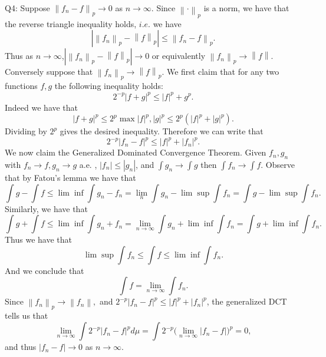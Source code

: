 \documentclass[letterpaper]{article}
\newcommand{\norm}[1]{\left\lVert#1\right\rVert}
\begin{document}
Q4: Suppose $\norm{f_n-f}_p \to 0$ as $n\to \infty$. Since $\norm{\cdot}_p$ is a norm, we have that the reverse triangle inequality holds, $i.e.$ we have $$|\norm{f_n}_p - \norm{f}_p|\leq \norm{f_n-f}_p.$$ Thus as $n\to \infty$,$|\norm{f_n}_p - \norm{f}_p|\to 0$ or equivalently $\norm{f_n}_p \to \norm{f}$. Conversely suppose that $\norm{f_n}_p \to \norm{f}_p $. We first claim that for any two functions $f,g$ the following inequality holds: $$2^{-p}|f+g|^p \leq |f|^p + g^p.$$ Indeed we have that $$|f+g|^p \leq 2^p \max{|f|^p,|g|^p} \leq 2^{p}(|f|^p + |g|^p).$$ Dividing by $2^{p}$ gives the desired inequality. Therefore we can write that $$2^{-p}|f_n - f|^p \leq |f|^p + |f_n|^p.$$ We now claim the Generalized Dominated Convergence Theorem. Given $f_n,g_n$ with $f_n \to f ,g_n \to g$ a.e. , $|f_n|\leq |g_n|$, and $\int {g_n} \to \int g$ then $\int f_n \to \int f$. Observe that by Fatou's lemma we have that $$ \int g- \int f \leq \lim \inf \int g_n - f_n = \lim_{n} \int g_n - \lim \sup \int f_n = \int g - \lim \sup \int f_n.$$
Similarly, we have that $$\int g + \int f \leq \lim \inf \int g_n + f_n = \lim_{n \to \infty} \int g_n + \lim \inf \int f_n  = \int g + \lim \inf \int f_n.$$ Thus we have that $$\lim \sup \int f_n \leq \int f \leq \lim \inf \int f_n.$$ And we conclude that $$\int f = \lim_{n\to \infty} \int f_n.$$ Since $\norm{f_n}_p \to \norm{f_n},$ and $2^{-p} |f_n - f|^p \leq |f|^p + |f_n|^p$, the generalized DCT tells us that $$\lim_{n\to \infty} \int 2^{-p}|f_n - f|^p d\mu = \int 2^{-p} \Big(\lim_{n\to \infty}  |f_n - f|\Big)^p = 0,$$ and thus $|f_n-f|\to 0$ as $n\to \infty$. 
\end{document}
